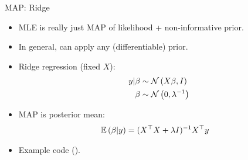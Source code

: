 \begin{frame}{MAP: Ridge}
\begin{itemize}
    \item MLE is really just MAP of likelihood + non-informative prior.
    \item In general, can apply any (differentiable) prior.
    \item Ridge regression (fixed $X$): 
    \begin{align*}
        y | \beta &\sim \operatorname{\mathcal{N}}\left(X\beta, I\right) \\
        \beta &\sim \operatorname{\mathcal{N}}\left(0, \lambda^{-1}\right)
    \end{align*}
    \item MAP is posterior mean:
    \begin{align*}
        \mathbb{E}\left(\beta | y\right)
        &=
        (X^\top X + \lambda I)^{-1} X^\top y
    \end{align*}
    \item Example code (\href{https://github.com/JamesYang007/FastAD-Report/blob/master/slides/stanford-01272022/examples/src/map.cpp}{}).
\end{itemize} 
\end{frame}
